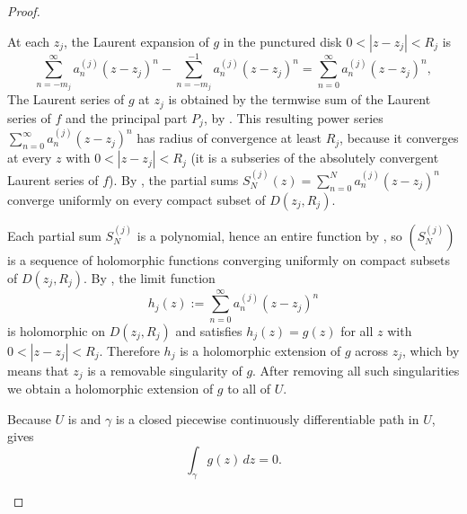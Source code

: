 \begin{proof}
\begin{enumerate}
        At each $z_j$, the Laurent expansion of $g$ in the punctured disk $0 < |z - z_j| < R_j$ is
        $$\sum_{n=-m_j}^{\infty} a_n^{(j)} (z - z_j)^n - \sum_{n=-m_j}^{-1} a_n^{(j)} (z - z_j)^n = \sum_{n=0}^{\infty} a_n^{(j)} (z - z_j)^n,$$
        The Laurent series of $g$ at $z_j$ is obtained by the termwise sum of the Laurent series of $f$ and the principal part $P_j$, by . This resulting power series $\sum_{n=0}^\infty a_n^{(j)} (z - z_j)^n$ has radius of convergence at least $R_j$, because it converges at every $z$ with $0 < |z - z_j| < R_j$ (it is a subseries of the absolutely convergent Laurent series of $f$). By , the partial sums $S_N^{(j)}(z) = \sum_{n=0}^N a_n^{(j)} (z - z_j)^n$ converge uniformly on every compact subset of $D(z_j, R_j)$.

        Each partial sum $S_N^{(j)}$ is a polynomial, hence an entire function by , so $(S_N^{(j)})$ is a sequence of holomorphic functions converging uniformly on compact subsets of $D(z_j, R_j)$. By , the limit function
        $$h_j(z) := \sum_{n=0}^{\infty} a_n^{(j)} (z - z_j)^n$$
        is holomorphic on $D(z_j, R_j)$ and satisfies $h_j(z) = g(z)$ for all $z$ with $0 < |z - z_j| < R_j$. Therefore $h_j$ is a holomorphic extension of $g$ across $z_j$, which by  means that $z_j$ is a removable singularity of $g$. After removing all such singularities we obtain a holomorphic extension of $g$ to all of $U$.
        

        Because $U$ is  and $\gamma$ is a closed piecewise continuously differentiable path in $U$,  gives
        $$\int_{\gamma} g(z) \, dz = 0.$$


\end{enumerate}
\end{proof}
